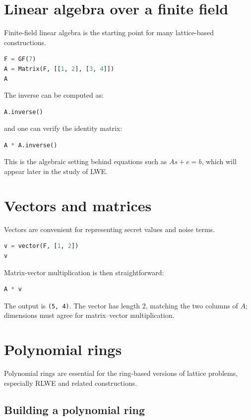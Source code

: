 \section{Linear algebra over a finite field}
Finite-field linear algebra is the starting point for many lattice-based constructions.

\begin{lstlisting}[language=Python]
F = GF(7)
A = Matrix(F, [[1, 2], [3, 4]])
A
\end{lstlisting}

The inverse can be computed as:

\begin{lstlisting}[language=Python]
A.inverse()
\end{lstlisting}

and one can verify the identity matrix:

\begin{lstlisting}[language=Python]
A * A.inverse()
\end{lstlisting}

This is the algebraic setting behind equations such as $A s + e = b$, which will appear later in the study of LWE.

\section{Vectors and matrices}
Vectors are convenient for representing secret values and noise terms.

\begin{lstlisting}[language=Python]
v = vector(F, [1, 2])
v
\end{lstlisting}

Matrix-vector multiplication is then straightforward:

\begin{lstlisting}[language=Python]
A * v
\end{lstlisting}

The output is \texttt{(5, 4)}. The vector has length $2$, matching the two columns of $A$; dimensions must agree for matrix--vector multiplication.

\section{Polynomial rings}
Polynomial rings are essential for the ring-based versions of lattice problems, especially RLWE and related constructions.

\subsection{Building a polynomial ring}

